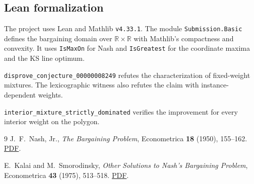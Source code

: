 \documentclass[11pt]{article}
\begin{document}
\subsection*{Lean formalization}
The project uses Lean and Mathlib \texttt{v4.33.1}. The module
\texttt{Submission.Basic} defines the bargaining domain over
$\mathbb R\times\mathbb R$ with Mathlib's compactness and convexity.
It uses \texttt{IsMaxOn} for Nash and \texttt{IsGreatest} for the
coordinate maxima and the KS line optimum.

\smallskip\noindent
\texttt{disprove\_conjecture\_00000008249} refutes the characterization
of fixed-weight mixtures. The lexicographic witness also refutes the claim
with instance-dependent weights.

\smallskip\noindent
\texttt{interior\_mixture\_strictly\_dominated} verifies the improvement
for every interior weight on the polygon.

\begin{thebibliography}{9}
J.~F.~Nash, Jr., \emph{The Bargaining Problem},
Econometrica \textbf{18} (1950), 155--162.
\href{https://jmvidal.cse.sc.edu/library/nash50a.pdf}{PDF}.

E.~Kalai and M.~Smorodinsky, \emph{Other Solutions to Nash's Bargaining
Problem}, Econometrica \textbf{43} (1975), 513--518.
\href{https://www.haverford.edu/sites/default/files/KalaiSmorodinsky1975.pdf}{PDF}.
\end{thebibliography}
\end{document}
